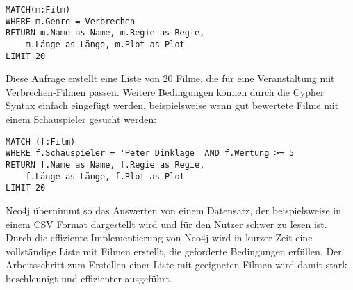\begin{Verbatim}[frame=single]
MATCH(m:Film) 
WHERE m.Genre = Verbrechen
RETURN m.Name as Name, m.Regie as Regie, 
	m.Länge as Länge, m.Plot as Plot 
LIMIT 20
\end{Verbatim}
Diese Anfrage erstellt eine Liste von 20 Filme, die für eine Veranstaltung mit Verbrechen-Filmen passen. Weitere Bedingungen können durch die Cypher Syntax einfach eingefügt werden, beispielsweise wenn gut bewertete Filme mit einem Schauspieler gesucht werden:
\begin{Verbatim}[frame=single]
MATCH (f:Film) 
WHERE f.Schauspieler = 'Peter Dinklage' AND f.Wertung >= 5
RETURN f.Name as Name, f.Regie as Regie, 
	f.Länge as Länge, f.Plot as Plot 
LIMIT 20
\end{Verbatim}
Neo4j übernimmt so das Auswerten von einem Datensatz, der beispielsweise in einem CSV Format dargestellt wird und für den Nutzer schwer zu lesen ist. Durch die effiziente Implementierung von Neo4j wird in kurzer Zeit eine vollständige Liste mit Filmen erstellt, die geforderte Bedingungen erfüllen. Der Arbeitsschritt zum Erstellen einer Liste mit geeigneten Filmen wird damit stark beschleunigt und effizienter ausgeführt.
